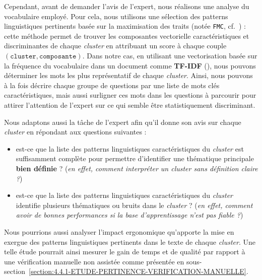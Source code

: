 			Cependant, avant de demander l'avis de l'expert, nous réalisons une analyse du vocabulaire employé.
			Pour cela, nous utilisons une sélection des patterns linguistiques pertinents basée sur la maximisation des traits (notée \texttt{FMC}, cf.~\cite{lamirel-etal:2017:novel-approach-feature}) : cette méthode permet de trouver les composantes vectorielle caractéristiques et discriminantes de chaque \textit{cluster} en attribuant un score à chaque couple $(\texttt{cluster}, \texttt{composante})$.
			Dans notre cas, en utilisant une vectorisation basée sur la fréquence du vocabulaire dans un document comme \textbf{TF-IDF} (\cite{sparck-jones:1972:statistical-interpretation-term}), nous pouvons déterminer les mots les plus représentatif de chaque \textit{cluster}.
			Ainsi, nous pouvons à la fois décrire chaque groupe de questions par une liste de mots clés caractéristiques, mais aussi surligner ces mots dans les questions à parcourir pour attirer l'attention de l'expert sur ce qui semble être statistiquement discriminant.
			
			Nous adaptons aussi la tâche de l'expert afin qu'il donne son avis sur chaque \textit{cluster} en répondant aux questions suivantes :
			\begin{itemize}
				\item est-ce que la liste des patterns linguistiques caractéristiques du \textit{cluster} est suffisamment complète pour permettre d'identifier une thématique principale \textbf{bien définie} ? (\textit{en effet, comment interpréter un cluster sans définition claire ?})
				\item est-ce que la liste des patterns linguistiques caractéristiques du \textit{cluster} identifie plusieurs thématiques ou bruits dans le \textit{cluster} ? (\textit{en effet, comment avoir de bonnes performances si la base d'apprentissage n'est pas fiable ?})
			\end{itemize}
			
			\begin{leftBarIdea}
				Nous pourrions aussi analyser l'impact ergonomique qu'apporte la mise en exergue des patterns linguistiques pertinents dans le texte de chaque \textit{cluster}.
				Une telle étude pourrait ainsi mesurer le gain de temps et de qualité par rapport à une vérification manuelle non assistée comme présentée en sous-section~\ref{section:4.4.1-ETUDE-PERTINENCE-VERIFICATION-MANUELLE}.
			\end{leftBarIdea}
			
